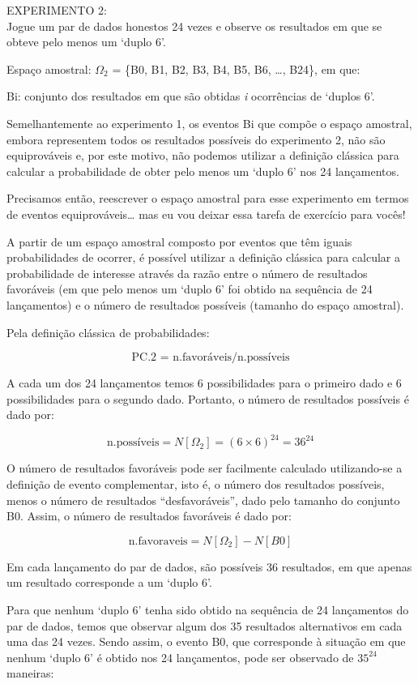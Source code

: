 \documentclass[
]{book}
\theoremstyle{definition}
\theoremstyle{definition}
\theoremstyle{definition}
\theoremstyle{remark}
\begin{document}
EXPERIMENTO 2:\\
Jogue um par de dados honestos 24 vezes e observe os resultados em que se obteve pelo menos um `duplo 6'.

Espaço amostral: \(\Omega_2\) = \{B0, B1, B2, B3, B4, B5, B6, \ldots, B24\}, em que:

Bi: conjunto dos resultados em que são obtidas \emph{i} ocorrências de `duplos 6'.

Semelhantemente ao experimento 1, os eventos Bi que compõe o espaço amostral, embora representem todos os resultados possíveis do experimento 2, não são equiprováveis e, por este motivo, não podemos utilizar a definição clássica para calcular a probabilidade de obter pelo menos um `duplo 6' nos 24 lançamentos.

Precisamos então, reescrever o espaço amostral para esse experimento em termos de eventos equiprováveis\ldots{} mas eu vou deixar essa tarefa de exercício para vocês!

A partir de um espaço amostral composto por eventos que têm iguais probabilidades de ocorrer, é possível utilizar a definição clássica para calcular a probabilidade de interesse através da razão entre o número de resultados favoráveis (em que pelo menos um `duplo 6' foi obtido na sequência de 24 lançamentos) e o número de resultados possíveis (tamanho do espaço amostral).

Pela definição clássica de probabilidades:

\[\text{PC.2 = n.favoráveis/n.possíveis}\]

A cada um dos 24 lançamentos temos 6 possibilidades para o primeiro dado e 6 possibilidades para o segundo dado. Portanto, o número de resultados possíveis é dado por:

\[\text{n.possíveis} =  {N[\Omega_2]= (6\times 6)^{24} = 36^{24}}\]

O número de resultados favoráveis pode ser facilmente calculado utilizando-se a definição de evento complementar, isto é, o número dos resultados possíveis, menos o número de resultados ``desfavoráveis'', dado pelo tamanho do conjunto B0. Assim, o número de resultados favoráveis é dado por:

\[\text{n.favoraveis} =  {N[\Omega_2] - N[B0]}\]

Em cada lançamento do par de dados, são possíveis 36 resultados, em que apenas um resultado corresponde a um `duplo 6'.

Para que nenhum `duplo 6' tenha sido obtido na sequência de 24 lançamentos do par de dados, temos que observar algum dos 35 resultados alternativos em cada uma das 24 vezes. Sendo assim, o evento B0, que corresponde à situação em que nenhum `duplo 6' é obtido nos 24 lançamentos, pode ser observado de \(35^{24}\) maneiras:
\end{document}

